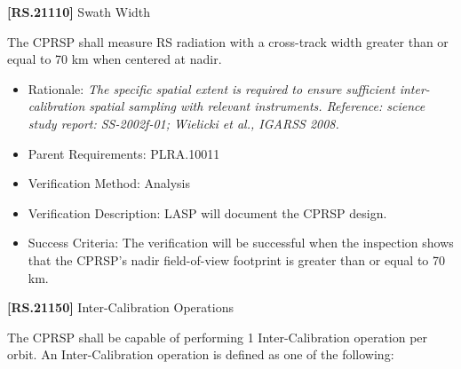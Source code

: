 \documentclass[12pt,oneside,oldfontcommands]{memoir}
\begin{document}
\textbf{[RS.21110]} Swath Width

The \gls{CPRSP} shall \gls{measure} \gls{RS} radiation with a cross-track width greater than or equal to 70 km when centered at nadir.

\begin{itemize}
\item{} Rationale: \emph{The specific spatial extent is required to ensure sufficient inter-calibration spatial sampling with relevant instruments. Reference: science study report: SS-2002f-01; Wielicki et al., IGARSS 2008.}

\item{} Parent Requirements: PLRA.10011

\item{} Verification Method: Analysis

\item{} Verification Description: \gls{LASP} will document the \gls{CPRSP} design.

\item{} Success Criteria: The verification will be successful when the \gls{inspection} shows that the \gls{CPRSP}'s nadir field-of-view footprint is greater than or equal to 70 km.

\end{itemize}

\textbf{[RS.21150]} Inter-Calibration Operations

The \gls{CPRSP} shall be capable of performing 1 Inter-Calibration operation per orbit. An Inter-Calibration operation is defined as one of the following:
\end{document}
